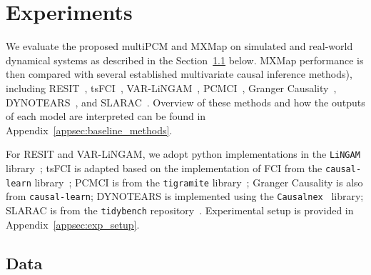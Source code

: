 \section{Experiments}
\label{sec:exp}


We evaluate the proposed multiPCM and MXMap on simulated and real-world dynamical systems as described in the Section~\ref{sec:data} below. MXMap performance is then compared with several established multivariate causal inference methods), including RESIT~\citep{peters2014causal}, tsFCI~\citep{entner2010causal}, VAR-LiNGAM~\citep{hyvarinen2010estimation}, PCMCI~\citep{runge2019detecting}, Granger Causality~\citep{granger1969investigating}, DYNOTEARS~\citep{pamfil2020dynotears}, and SLARAC~\citep{weichwald2020causal}. Overview of these methods and how the outputs of each model are interpreted can be found in Appendix~\ref{appsec:baseline_methods}. 

For RESIT and VAR-LiNGAM, we adopt python implementations in the \texttt{LiNGAM} library~\citep{shimizu2014lingam}; tsFCI is adapted based on the implementation of FCI from the \texttt{causal-learn} library~\citep{zheng2024causal}; PCMCI is from the \texttt{tigramite} library~\citep{runge2023causal}; Granger Causality is also from \texttt{causal-learn}; DYNOTEARS is implemented using the \texttt{Causalnex}~\citep{Beaumont_CausalNex_2021} library; SLARAC is from the \texttt{tidybench} repository~\citep{weichwald2020causal}. Experimental setup is provided in Appendix~\ref{appsec:exp_setup}.

\subsection{Data}
\label{sec:data}

